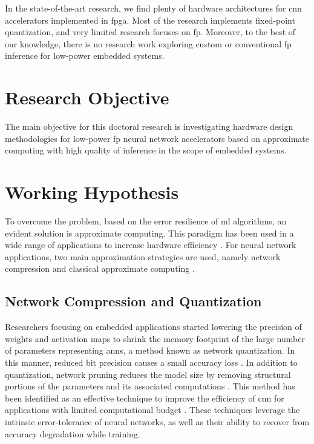 In the state-of-the-art research, we find plenty of hardware architectures for \gls{cnn} accelerators implemented in \gls{fpga}. Most of the research implements fixed-point quantization, and very limited research focuses on \gls{fp}. Moreover, to the best of our knowledge, there is no research work exploring custom or conventional \gls{fp} inference for low-power embedded systems.

\section{Research Objective}
The main objective for this doctoral research is investigating hardware design methodologies for low-power \gls{fp} neural network accelerators based on approximate computing with high quality of inference in the scope of embedded systems.

\section{Working Hypothesis}
To overcome the problem, based on the error resilience of \gls{ml} algorithms, an evident solution is approximate computing. This paradigm has been used in a wide range of applications to increase hardware efficiency \cite{han2013approximate}. For neural network applications, two main approximation strategies are used, namely network compression and classical approximate computing \cite{bouvier2019spiking}.

\subsection{Network Compression and Quantization}
Researchers focusing on embedded applications started lowering the precision of weights and activation maps to shrink the memory footprint of the large number of parameters representing \glspl{ann}, a method known as network quantization. In this manner, reduced bit precision causes a small accuracy loss \cite{courbariaux2015binaryconnect, han2015deep, hubara2017quantized, rastegari2016xnor}. In addition to quantization, network pruning reduces the model size by removing structural portions of the parameters and its associated computations \cite{lecun1989optimal,hassibi1992second}. This method has been identified as an effective technique to improve the efficiency of \gls{cnn} for applications with limited computational budget \cite{molchanov2016pruning,li2016pruning, liu2018rethinking}. These techniques leverage the intrinsic error-tolerance of neural networks, as well as their ability to recover from accuracy degradation while training.

